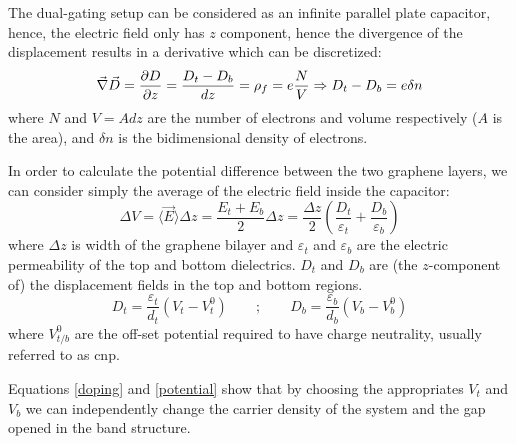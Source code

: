 The dual-gating setup can be considered as an infinite parallel plate capacitor, hence, the electric field only has $z$ component, hence the divergence of the displacement results in a derivative which can be discretized:
\begin{equation}
   \vec{\nabla}\vec{D}=\frac{\partial D}{\partial z} =\frac{D_t-D_b}{dz} = \rho_f =
   e\frac{N}{V} \Rightarrow D_t-D_b = e\delta n
\label{doping}
\end{equation}
where $N$ and $V=Adz$ are the number of electrons and volume respectively ($A$ is the area), and $\delta n$ is the bidimensional density of electrons.

In order to calculate the potential difference between the two graphene layers, we can consider simply the average of the electric field inside the capacitor:
\begin{equation}
   \Delta V = \langle\vec{E}\rangle \Delta z = \frac{E_t+E_b}{2} \Delta z=
   \frac{\Delta z}{2} \left(\frac{D_t}{\varepsilon_t} +
                            \frac{D_b}{\varepsilon_b} \right)
\label{potential}
\end{equation}
where $\Delta z$ is width of the graphene bilayer and $\varepsilon_t$ and       $\varepsilon_b$ are the electric permeability of the top and bottom             dielectrics. $D_t$ and $D_b$ are (the $z$-component of) the displacement fields in the top and bottom regions.
\begin{equation}
   D_t = \frac{\varepsilon_t}{d_t}\left(V_{t}-V^0_{t}\right) \qquad;\qquad
   D_b = \frac{\varepsilon_b}{d_b}\left(V_{b}-V^0_{b}\right)
\end{equation}
where $V^0_{t/b}$ are the off-set potential required to have charge neutrality, usually referred to as \ac{cnp}.

Equations \eqref{doping} and \eqref{potential} show that by choosing the        appropriates $V_t$ and $V_b$ we can independently change the carrier density of the system and the gap opened in the band structure\cite{Taychatanapat2010}.





